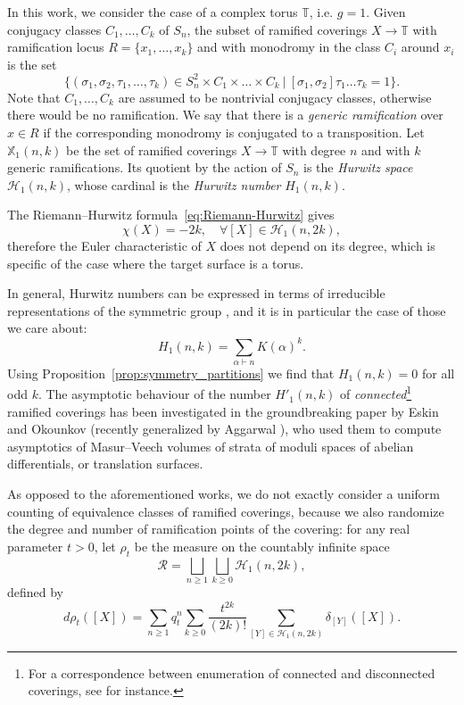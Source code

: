 \documentclass[11pt,a4paper,reqno]{article}
\theoremstyle{definition}
\theoremstyle{remark}
\newcommand\Tbb{\mathbb{T}}
\begin{document}
In this work, we consider the case of a complex torus $\Tbb$, i.e. $g=1$. Given conjugacy classes $C_1,\ldots,C_k$ of $S_n$, the subset of ramified coverings $X\to\Tbb$ with ramification locus $R=\{x_1,\ldots,x_k\}$ and with monodromy in the class $C_i$ around $x_i$ is the set
\[
\{(\sigma_1,\sigma_2,\tau_1,\ldots,\tau_k)\in S_n^2\times C_1\times\ldots\times C_k\ \vert \ [\sigma_1,\sigma_2]\tau_1\ldots\tau_k=1\}.
\]
Note that $C_1,\ldots,C_k$ are assumed to be nontrivial conjugacy classes, otherwise there would be no ramification. We say that there is a \emph{generic ramification} over $x\in R$ if the corresponding monodromy is conjugated to a transposition. Let $\mathbb{X}_1(n,k)$ be the set of ramified coverings $X\to\Tbb$ with degree $n$ and with $k$ generic ramifications. Its quotient by the action of $S_n$ is the \emph{Hurwitz space} $\mathcal{H}_1(n,k)$, whose cardinal is the \emph{Hurwitz number} $H_1(n,k)$.

The Riemann--Hurwitz formula~\eqref{eq:Riemann-Hurwitz} gives
\[
\chi(X)=-2k,\quad \forall [X]\in\mathcal{H}_1(n,2k),
\]
therefore the Euler characteristic of $X$ does not depend on its degree, which is specific of the case where the target surface is a torus.

In general, Hurwitz numbers can be expressed in terms of irreducible representations of the symmetric group \cite{LZ}, and it is in particular the case of those we care about:
\begin{equation}\label{eq:Hurwitz_torus}
H_1(n,k)=\sum_{\alpha\vdash n} K(\alpha)^k.
\end{equation}
Using Proposition~\ref{prop:symmetry_partitions} we find that $H_1(n,k)=0$ for all odd $k$. The asymptotic behaviour of the number $H'_1(n,k)$ of \emph{connected}\footnote{For a correspondence between enumeration of connected and disconnected coverings, see \cite[\S 2.2]{EO} for instance.} ramified coverings has been investigated in the groundbreaking paper \cite{EO} by Eskin and Okounkov (recently generalized by Aggarwal \cite{Agg}), who used them to compute asymptotics of Masur--Veech volumes of strata of moduli spaces of abelian differentials, or translation surfaces.

As opposed to the aforementioned works, we do not exactly consider a uniform counting of equivalence classes of ramified coverings, because we also randomize the degree and number of ramification points of the covering: for any real parameter $t>0$, let $\rho_t$ be the measure on the countably infinite space
\[
\mathcal{R}=\bigsqcup_{n\geq 1}\bigsqcup_{k\geq 0}\mathcal{H}_1(n,2k),
\]
defined by
\[
d\rho_t([X])=\sum_{n\geq 1}q_t^n\sum_{k\geq 0}\frac{t^{2k}}{(2k)!}\sum_{[Y]\in\mathcal{H}_1(n,2k)}\delta_{[Y]}([X]).
\]
\end{document}
